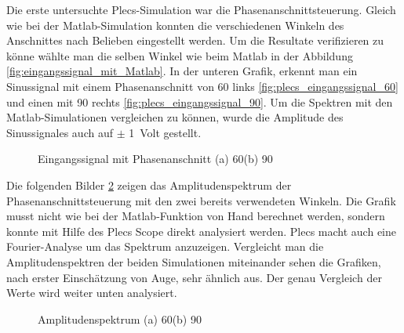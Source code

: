 Die erste untersuchte Plecs-Simulation war die Phasenanschnittsteuerung. Gleich wie bei der Matlab-Simulation konnten die verschiedenen Winkeln des Anschnittes nach Belieben eingestellt werden. Um die Resultate verifizieren zu könne wählte man die selben Winkel wie beim Matlab in der Abbildung \ref{fig:eingangssignal_mit_Matlab}. In der unteren Grafik, erkennt man ein Sinussignal mit einem Phasenanschnitt von 60\textdegree \hspace{0.02cm} links \ref{fig:plecs_eingangssignal_60} und einen mit 90\textdegree \hspace{0.02cm} rechts \ref{fig:plecs_eingangssignal_90}. Um die Spektren mit den Matlab-Simulationen vergleichen zu können, wurde die Amplitude des Sinussignales auch auf $\pm$ \SI{1}{Volt} gestellt.  

\begin{figure}[ht!]
	\centering
	\qquad
	\caption{Eingangssignal mit Phasenanschnitt (a) 60\textdegree (b) 90\textdegree}
	\label{fig:Eingangssignal simuliert mit Plecs}
\end{figure}

\newpage

Die folgenden Bilder \ref{fig:plecs_Amplitudenspektrum} zeigen das Amplitudenspektrum der Phasenanschnittsteuerung mit den zwei bereits verwendeten Winkeln. Die Grafik musst nicht wie bei der Matlab-Funktion von Hand berechnet werden, sondern konnte mit Hilfe des Plecs Scope direkt analysiert werden. Plecs macht auch eine Fourier-Analyse um das Spektrum anzuzeigen. Vergleicht man die Amplitudenspektren der beiden Simulationen miteinander sehen die Grafiken, nach erster Einschätzung von Auge, sehr ähnlich aus. Der genau Vergleich der Werte wird weiter unten analysiert.   
     
\begin{figure}[ht!]
	\centering
	\qquad
	\caption{Amplitudenspektrum (a) 60\textdegree (b) 90\textdegree}
	\label{fig:plecs_Amplitudenspektrum}
\end{figure}

